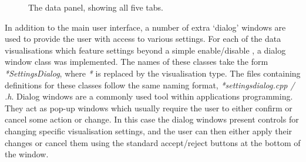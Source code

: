 \begin{figure}
 \centering
 \decoRule
 \caption[Data Panel]{The data panel, showing all five tabs.}
 \label{fig:DataPanel}
\end{figure}

\clearpage
In addition to the main user interface, a number of extra `dialog' windows are used to provide the user with access to various settings. For each of the data visualisations which feature settings beyond a simple enable/disable , a dialog window class was implemented. The names of these classes take the form \textit{*SettingsDialog}, where \textit{*} is replaced by the visualisation type. The files containing definitions for these classes follow the same naming format, \textit{*settingsdialog.cpp / .h}. Dialog windows are a commonly used tool within applications programming. They act as pop-up windows which usually require the user to either confirm or cancel some action or change. In this case the dialog windows present controls for changing specific visualisation settings, and the user can then either apply their changes or cancel them using the standard accept/reject buttons at the bottom of the window.

